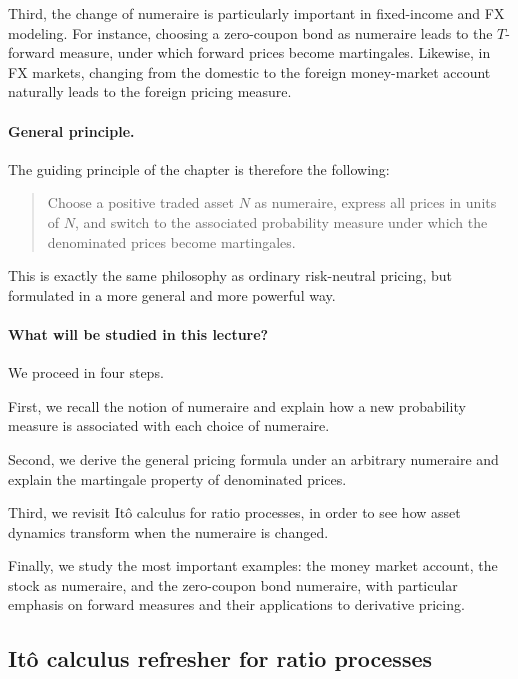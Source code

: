 \documentclass[11pt]{article}
\theoremstyle{definition}
\theoremstyle{plain}
\begin{document}
Third, the change of numeraire is particularly important in fixed-income
and FX modeling.
For instance, choosing a zero-coupon bond as numeraire leads to the
\(T\)-forward measure, under which forward prices become martingales.
Likewise, in FX markets, changing from the domestic to the foreign
money-market account naturally leads to the foreign pricing measure.

\paragraph{General principle.}

The guiding principle of the chapter is therefore the following:

\begin{quote}
Choose a positive traded asset \(N\) as numeraire, express all prices in
units of \(N\), and switch to the associated probability measure under
which the denominated prices become martingales.
\end{quote}

This is exactly the same philosophy as ordinary risk-neutral pricing,
but formulated in a more general and more powerful way.

\paragraph{What will be studied in this lecture?}

We proceed in four steps.

First, we recall the notion of numeraire and explain how a new
probability measure is associated with each choice of numeraire.

Second, we derive the general pricing formula under an arbitrary
numeraire and explain the martingale property of denominated prices.

Third, we revisit It\^o calculus for ratio processes, in order to see
how asset dynamics transform when the numeraire is changed.

Finally, we study the most important examples:
the money market account, the stock as numeraire, and the zero-coupon
bond numeraire, with particular emphasis on forward measures and their
applications to derivative pricing.

\subsection{It\^o calculus refresher for ratio processes}
\end{document}

